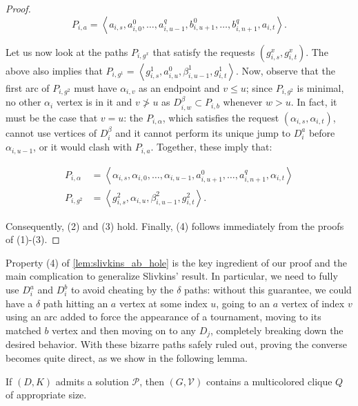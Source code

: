 \documentclass[a4paper,UKenglish,cleveref, autoref, thm-restate]{lipics-v2021}
\newcommand{\angled}[1]{\left\langle{#1}\right\rangle}
\begin{document}
\begin{proof}
      \begin{equation*}
        P_{i,a} = \angled{a_{i,s}, a^0_{i,0}, \dots, a^q_{i, u-1}, b^0_{i, u+1}, \dots,
        b^q_{i, n+1}, a_{i,t}}.
      \end{equation*}

      Let us now look at the paths $P_{i,g^x}$ that satisfy the requests
      $(g^x_{i,s}, g^x_{i,t})$. The above also implies that $P_{i,g^1} =
      \angled{g^1_{i,s}, a^0_{i,u}, \beta^1_{i,u-1}, g^1_{i,t}}$.
      Now, observe that the first arc of $P_{i, g^2}$ must have $\alpha_{i,v}$ as an
      endpoint and $v \leq u$; since $P_{i, g^2}$ is minimal, no other $\alpha_i$ vertex
      is in it and $v \not> u$ as $D^\beta_{i,w} \subset P_{i,b}$ whenever $w > u$.
      In fact, it must be the case that $v = u$: the $P_{i,\alpha}$, which satisfies the
      request $(\alpha_{i,s}, \alpha_{i,t})$, cannot use vertices of
      $D^\beta_i$ and it cannot perform its unique jump to $D^a_{i}$ before
      $\alpha_{i,u-1}$, or it would clash with $P_{i,a}$. Together, these imply that:

      \begin{align*}
        P_{i,\alpha} &= \angled{\alpha_{i,s}, \alpha_{i,0}, \dots, \alpha_{i, u-1},
          a^0_{i, u+1}, \dots,
        a^q_{i, n+1}, \alpha_{i,t}}\\
        P_{i,g^2} &= \angled{g^2_{i,s}, \alpha_{i,u}, \beta^2_{i,u-1}, g^2_{i,t}}.
      \end{align*}

      Consequently, (2) and (3) hold. Finally, (4) follows immediately from the proofs of (1)-(3).
    \end{proof}

    Property (4) of \autoref{lem:slivkins_ab_hole} is the key ingredient of our proof
    and the main complication to generalize Slivkins' result. In particular, we need to
    fully use $D^a_i$ and $D^b_i$ to avoid cheating by the $\delta$ paths: without this
    guarantee, we could have a $\delta$ path hitting an $a$ vertex at some index $u$,
    going to an $a$ vertex of index $v$ using an arc added to force the appearance of a
    tournament, moving to its matched $b$ vertex and then moving on to any $D_j$,
    completely breaking down the desired behavior.
    With these bizarre paths safely ruled out, proving the converse becomes quite direct,
    as we show in the following lemma.

    \begin{lemma}
      \label{lem:slivkins_backward}
      If $(D, K)$ admits a solution $\mathcal{P}$, then $(G, \mathcal{V})$ contains a
      multicolored clique $Q$ of appropriate size.
    \end{lemma}
\end{document}
